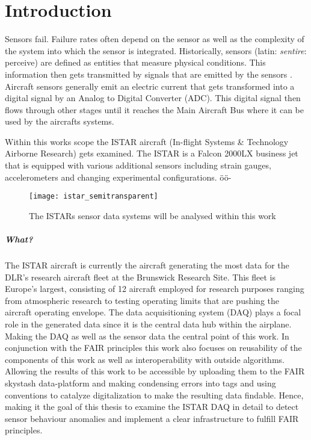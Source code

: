 \chapter{Introduction \label{ch1-intro}}

Sensors fail. Failure rates often depend on the sensor as well as the complexity of the system into which the sensor is integrated. Historically, sensors (latin: \textit{sentire}: perceive) are defined as entities that measure physical conditions. This information then gets transmitted by signals that are emitted by the sensors \cite{din_din_1995, pena-consuegra_manufacturing_2023}. Aircraft sensors generally emit an electric current that gets transformed into a digital signal by an Analog to Digital Converter (ADC). This digital signal then flows through other stages until it reaches the Main Aircraft Bus where it can be used by the aircrafts systems.

Within this works scope the ISTAR aircraft (In-flight Systems & Technology Airborne Research) gets examined. The ISTAR is a Falcon 2000LX business jet that is equipped with various additional sensors including strain gauges, accelerometers and changing experimental configurations. öö-

\begin{figure}
    \centering
    \texttt{[image: istar\_semitransparent]}
    \caption{The ISTARs sensor data systems will be analysed within this work \cite{dlr_dlr-forschungsflugzeug_2020}}
    \label{fig:istar_semitransparent}
\end{figure}

\paragraph{What?}

The ISTAR aircraft is currently the aircraft generating the most data for the DLR's research aircraft fleet at the Brunswick Research Site. This fleet is Europe's largest, consisting of 12 aircraft employed for research purposes ranging from atmospheric research to testing operating limits that are pushing the aircraft operating envelope.
The data acquisitioning system (DAQ) plays a focal role in the generated data since it is the central data hub within the airplane. Making the DAQ as well as the sensor data the central point of this work.
In conjunction with the FAIR principles this work also focuses on reusability of the components of this work as well as interoperability with outside algorithms. Allowing the results of this work to be accessible by uploading them to the FAIR skystash data-platform and making condensing errors into tags and using conventions to catalyze digitalization to make the resulting data findable.
Hence, making it the goal of this thesis to examine the ISTAR DAQ in detail to detect sensor behaviour anomalies and implement a clear infrastructure to fulfill FAIR principles.

